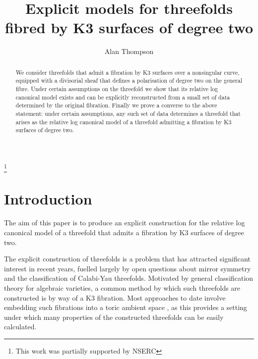 \documentclass{amsart}
\begin{document}
\newtheorem{thm}{Theorem}[section]
\newtheorem{lemma}[thm]{Lemma}
\newtheorem{prop}[thm]{Proposition}
\newtheorem{cor}[thm]{Corollary}
\theoremstyle{definition}
\newtheorem{defn}[thm]{Definition}
\newtheorem{remark}[thm]{Remark}
\newtheorem{assumption}[thm]{Assumptions}

\author{Alan Thompson}
\address{Department of Mathematical and Statistical Sciences\\ 
University of Alberta\\ 
Edmonton, AB, Canada, T6G 2G1}
\thanks{This work was partially supported by NSERC}



\title[Explicit models for threefolds fibred by K3 surfaces of degree two]{Explicit models for threefolds fibred by K3 surfaces of degree two}

\begin{abstract} We consider threefolds that admit a fibration by K3 surfaces over a nonsingular curve, equipped with a divisorial sheaf that defines a polarisation of degree two on the general fibre. Under certain assumptions on the threefold we show that its relative log canonical model exists and can be explicitly reconstructed from a small set of data determined by the original fibration. Finally we prove a converse to the above statement: under certain assumptions, any such set of data determines a threefold that arises as the relative log canonical model of a threefold admitting a fibration by K3 surfaces of degree two. \end{abstract}
\maketitle

\section{Introduction}\label{intro}

The aim of this paper is to produce an explicit construction for the relative log canonical model of a threefold that admits a fibration by K3 surfaces of degree two.

The explicit construction of threefolds is a problem that has attracted significant interest in recent years, fuelled largely by open questions about mirror symmetry and the classification of Calabi-Yau threefolds. Motivated by general classification theory for algebraic varieties, a common method by which such threefolds are constructed is by way of a K3 fibration. Most approaches to date involve embedding such fibrations into a toric ambient space \cite{sfk3f}\cite{cyvpk3s}\cite{k3fcy31}\cite{tcyhfwk3h}, as this provides a setting under which many properties of the constructed threefolds can be easily calculated.
\end{document}
